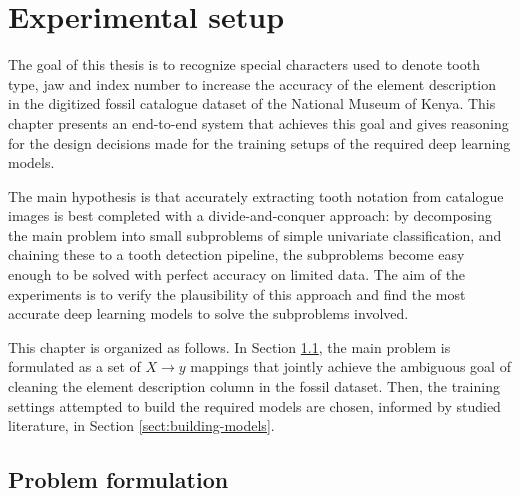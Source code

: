 \documentclass{article}
\begin{document}
\section{Experimental setup}


The goal of this thesis is to recognize special characters used to denote tooth type,
jaw and index number to increase the accuracy of the element description in
the digitized fossil catalogue dataset of the National Museum of Kenya. This 
chapter presents an end-to-end system that achieves this goal and gives reasoning 
for the design decisions made for the training setups of the required deep learning 
models.

The main hypothesis is that accurately extracting tooth notation from catalogue images 
is best completed with a divide-and-conquer approach: by decomposing the main problem into small
subproblems of simple univariate classification, and chaining these to a tooth detection pipeline,
the subproblems become easy enough to be solved with perfect accuracy on limited data.
The aim of the experiments is to verify the plausibility of this approach and find the most accurate deep 
learning models to solve the subproblems involved.

This chapter is organized as follows. In Section \ref{sect:problem-formulation}, the main problem is formulated as a set of $X\to y$ 
mappings that jointly achieve the ambiguous goal of cleaning the element description column in the fossil 
dataset. Then, the training settings attempted to build the required models are chosen, informed by
studied literature, in Section \ref{sect:building-models}.

\subsection{Problem formulation}
\label{sect:problem-formulation}
\end{document}
